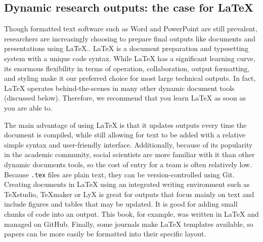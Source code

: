 \subsection{Dynamic research outputs: the case for {\LaTeX}}

Though formatted text software such as Word and PowerPoint are still prevalent,
researchers are increasingly choosing to prepare final outputs
like documents and presentations using {\LaTeX}.\index{{\LaTeX}}.
{\LaTeX} is a document preparation and typesetting system with a unique code syntax.
While {\LaTeX} has a significant learning curve,
its enormous flexibility in terms of operation, collaboration, output formatting, and styling
make it our preferred choice for most large technical outputs.
In fact, {\LaTeX} operates behind-the-scenes in many other dynamic document tools (discussed below).
Therefore, we recommend that you learn {\LaTeX} as soon as you are able to.

The main advantage of using {\LaTeX} is that it updates outputs every time the document is compiled,
while still allowing for text to be added with a relative simple syntax and user-friendly interface.
Additionally, because of its popularity in the academic community,
social scientists are more familiar with it than other dynamic documents tools,
so the cost of entry for a team is often relatively low.
Because \texttt{.tex} files are plain text,
they can be version-controlled using Git.
Creating documents in {\LaTeX} using an integrated writing environment such as TeXstudio, TeXmaker or LyX
is great for outputs that focus mainly on text
and include figures and tables that may be updated.
It is good for adding small chunks of code into an output.
This book, for example, was written in {\LaTeX} and managed on GitHub.
Finally, some journals make {\LaTeX} templates available,
so papers can be more easily be formatted into their specific layout.


